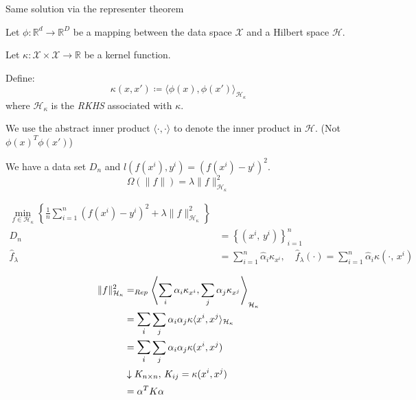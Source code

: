 \begin{example}[breakable]{Same solution via the representer theorem}{}

	Let $\phi: \mathds R^d \to \mathds R^D$ be a mapping between
	the data space $\mathcal X$ and a Hilbert space $\mathcal H$.

	Let $\kappa : \mathcal X \times \mathcal X \to \mathds R$ be a kernel
	function.

	Define:
	\begin{equation*}
		\kappa(x, x') \coloneqq \langle \phi(x), \phi(x') \rangle_{\mathcal H_\kappa}
	\end{equation*}
	where $\mathcal H_\kappa$ is the \emph{RKHS} associated with $\kappa$.
	\begin{note}
		We use the abstract inner product $\langle \cdot, \cdot \rangle$ to
		denote the inner product in $\mathcal H$. (Not $\phi(x)^T \phi(x')$)
	\end{note}

	We have a data set $D_n$ and $l(f(x^i), y^i) = (f(x^i) - y^i)^2$.
	\begin{equation*}
		\Omega(\lVert f \rVert) =\lambda\lVert f \rVert_{\mathcal H_\kappa}^2
	\end{equation*}



\begin{align*}
	\min_{f \in \mathcal H_\kappa}
	\left\{
	\frac{1}{n} \sum_{i=1}^n \left(
	f(x^i) - y^i
	\right)^2 + \lambda \lVert f \rVert_{\mathcal H_\kappa}^2
	\right\}
	\\
	D_n            & = \left\{ (x^i,\, y^i) \right\}_{i=1}^n   \\
	\hat f_\lambda & = \sum_{i=1}^n \hat\alpha_i \kappa_{x^i},
	\quad
	\hat f_\lambda(\cdot) = \sum_{i=1}^n \hat\alpha_i \kappa(\cdot,\, x^i)
\end{align*}

\begin{align*}
	\lVert f \rVert_{\mathcal H_\kappa}^2 & =_{Rep}
	\left\langle \sum_i \alpha_i \kappa_{x^i}, \sum_j \alpha_j \kappa_{x^j} \right\rangle_{\mathcal H_\kappa}                                 \\
	                                      & = \mathlarger{\sum_i} \sum_j \alpha_i \alpha_j \kappa\langle x^i, x^j \rangle_{\mathcal H_\kappa} \\
	                                      & = \mathlarger{\sum_i} \sum_j \alpha_i \alpha_j \kappa(x^i, x^j)                                   \\
	                                      & \downarrow{} K_{n \times n},\, K_{ij} = \kappa(x^i, x^j)                                          \\
	                                      & = \alpha^T K \alpha
\end{align*}


\end{example}
